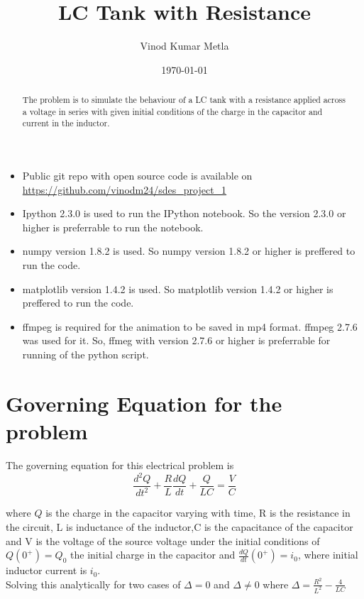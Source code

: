 \documentclass[12pt, a4paper]{report}
\title{\textbf{LC Tank with Resistance}}
\author{Vinod Kumar Metla}
\affil{Roll No. : 130010048}
\date{\today}
\begin{document}
\maketitle
\newpage

\begin{abstract}
 The problem is to simulate the behaviour of a LC tank with a resistance applied across a voltage in series with given initial conditions of the charge in the capacitor and current in the inductor.
\end{abstract}

\begin{itemize}
\item Public git repo with open source code is available on \url{https://github.com/vinodm24/sdes_project_1}
\item Ipython 2.3.0 is used to run the IPython notebook. So the version 2.3.0 or higher is preferrable to run the notebook.
\item numpy version 1.8.2 is used. So numpy version 1.8.2 or higher is preffered to run the code.
\item matplotlib version 1.4.2 is used. So matplotlib version 1.4.2 or higher is preffered to run the code. 
\item ffmpeg is required for the animation to be saved in mp4 format. ffmpeg 2.7.6 was used for it. So, ffmeg with version 2.7.6 or higher is preferrable for running of the python script.
\end{itemize}

\section*{Governing Equation for the problem}
The governing equation for this electrical problem is 
\begin{equation}
 \frac{d^2Q}{dt^2} + \frac{R}{L}\frac{dQ}{dt} + \frac{Q}{LC} = \frac{V}{C}
\end{equation}

where $Q$ is the charge in the capacitor varying with time, R is the resistance in the circuit, L is inductance of the inductor,C is the capacitance of the capacitor and V is the voltage of the source voltage under the initial conditions of $Q(0^+) = Q_0$ the initial charge in the capacitor and $\frac{dQ}{dt}(0^+) = i_0$, where initial inductor current is $i_0$. \\

Solving this analytically for two cases of $\Delta = 0$ and $\Delta \ne 0$ where $\Delta = \frac{R^2}{L^2} - \frac{4}{LC}$ \\
\end{document}
